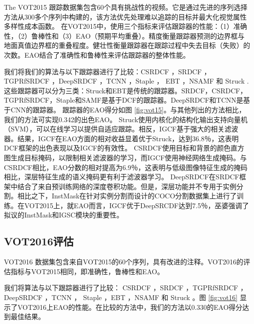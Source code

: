 The VOT2015 \cite{Kristan2015TheVO} 跟踪数据集包含60个具有挑战性的视频。它是通过先进的序列选择方法从300多个序列中构建的，该方法优先处理难以追踪的目标并最大化视觉属性多样性成本函数。
在VOT2015中，使用三个指标来评估跟踪器的性能：（1）准确性，（2）鲁棒性和（3）EAO（预期平均重叠）。精度衡量跟踪器预测的边界框与地面真值边界框的重叠程度。健壮性衡量跟踪器在跟踪过程中失去目标（失败）的次数。EAO结合了准确性和鲁棒性来评估跟踪器的整体性能。

我们将我们的算法与以下跟踪器进行了比较：CSRDCF \cite{Lukezic2017DiscriminativeCF}，SRDCF \cite{Danelljan2015LearningSR}，TGPRfSRDCF \cite{gao2018tracking}，DeepSRDCF \cite{Danelljan2015ConvolutionalFF}，TCNN \cite{nam2016modeling}，Staple \cite{Bertinetto2016StapleC}， EBT \cite{Zhu2016BeyondLS}，NSAMF \cite{Hua2015OnlineOT} 和 Struck \cite{Hare2011StruckSO}.
这些跟踪器可以分为三类：Struck和EBT是传统的跟踪器。SRDCF，CSRDCF，TGPRfSRDCF，Staple和SAMF是基于DCF的跟踪器。DeepSRDCF和TCNN是基于CNN的跟踪器。
跟踪器的EAO得分如图 \ref{fig:vot15}。与其他列出的方法相比，我们的方法可实现0.342的出色EAO。
Struck使用内核化的结构化输出支持向量机（SVM），可以在线学习以提供自适应跟踪。相反，IGCF基于强大的相关滤波器。结果，IGCF在EAO方面的相对收益显着优于Struck，达到36.8％，这表明DCF框架的出色表现以及IGCF的有效性。
CSRDCF使用目标和背景的颜色直方图生成目标掩码，以限制相关滤波器的学习，而IGCF使用神经网络生成掩码。与CSRDCF相比，EAO分数的相对提高为6.9％，这表明与低级图像特征生成的掩码相比，深层特征生成的语义掩码更有利于滤波器学习。
DeepSRDCF在SRDCF框架中结合了来自预训练网络的深度卷积功能。但是，深层功能并不专用于实例分割。相比之下，InstMask在针对实例分割而设计的COCO分割数据集上进行了训练。在VOT2015上，就EAO而言，IGCF优于DeepSRCDF达到7.5％，巫婆强调了拟议的InstMask和IGSC模块的重要性。

\subsection{VOT2016评估}
VOT2016 \cite{Kristan2016TheVO} 数据集包含来自VOT2015的60个序列，具有改进的注释。VOT2016的评估指标与VOT2015相同，即准确性，鲁棒性和EAO。

我们将算法与以下跟踪器进行了比较：
CSRDCF \cite{Lukezic2017DiscriminativeCF}，SRDCF \cite{Danelljan2015LearningSR}，TGPRfSRDCF \cite{gao2018tracking}，DeepSRDCF \cite{Danelljan2015ConvolutionalFF}，TCNN \cite{nam2016modeling}， Staple \cite{Bertinetto2016StapleC}，EBT \cite{Zhu2016BeyondLS}，NSAMF \cite{Hua2015OnlineOT} 和 Struck \cite{Hare2011StruckSO}。图 \ref{fig:vot16} 显示了VOT2016上EAO的性能。在比较的方法中，我们的方法以0.330的EAO得分达到最佳结果。

